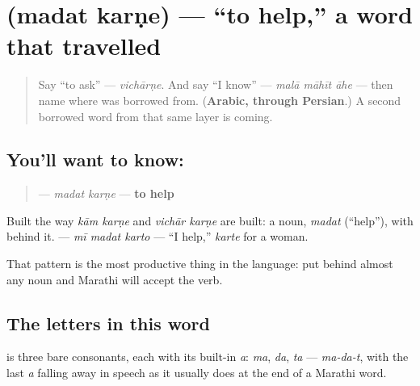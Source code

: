 \section[\texorpdfstring{\mr{मदत} \mr{करणे} (madat karṇe)}{मदत करणे (madat karṇe)}]{  (madat karṇe) — \textquotedblleft{}to help,\textquotedblright{} a word that travelled}

\label{lesson:MR-C09-madat-karne}



\begin{quote}
Say \textquotedblleft{}to ask\textquotedblright{} — \emph{vichārṇe}. And say \textquotedblleft{}I know\textquotedblright{} — \emph{malā māhīt āhe} — then name where \textbf{} was borrowed from. (\textbf{Arabic, through Persian}.) A second borrowed word from that same layer is coming.
\end{quote}

\subsection*{You'll want to know:  }
\begin{quote}
\textbf{ } — \emph{madat karṇe} — \textbf{to help}
\end{quote}

Built the way \emph{kām karṇe} and \emph{vichār karṇe} are built: a noun, \textbf{} \emph{madat} (\textquotedblleft{}help\textquotedblright{}), with \textbf{} behind it. \textbf{  } — \emph{mī madat karto} — \textquotedblleft{}I help,\textquotedblright{} \textbf{} \emph{karte} for a woman.

That pattern is the most productive thing in the language: put \textbf{} behind almost any noun and Marathi will accept the verb.

\subsection*{The letters in this word}
\textbf{} is three bare consonants, each with its built-in \emph{a}: \textbf{} \emph{ma}, \textbf{} \emph{da}, \textbf{} \emph{ta} — \emph{ma-da-t}, with the last \emph{a} falling away in speech as it usually does at the end of a Marathi word.

